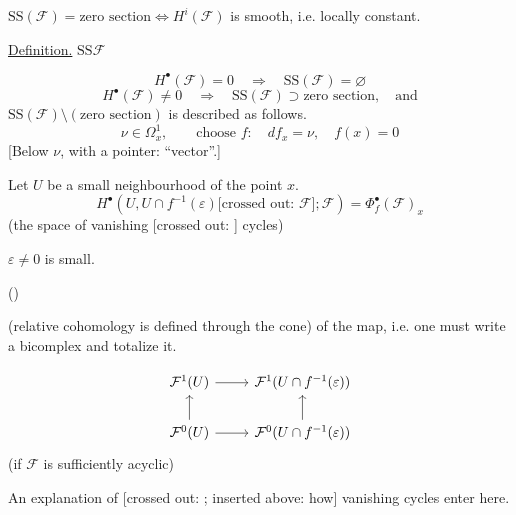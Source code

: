 $\mathrm{SS}(\mathcal{F})=\text{zero section}\Longleftrightarrow H^i(\mathcal{F})$ is smooth, i.e. locally constant.

\underline{Definition.} $\mathrm{SS}\mathcal{F}$

\begin{equation*}
H^\bullet(\mathcal{F})=0\quad\Rightarrow\quad\mathrm{SS}(\mathcal{F})=\varnothing\tag{1}
\end{equation*}
\begin{equation*}
H^\bullet(\mathcal{F})\neq0\quad\Rightarrow\quad\mathrm{SS}(\mathcal{F})\supset\text{zero section},\quad\text{and}
\end{equation*}
$\mathrm{SS}(\mathcal{F})\setminus(\text{zero section})$ is described as follows.
\begin{equation*}
\nu\in\Omega_x^1,\qquad\text{choose }f:\quad df_x=\nu,\quad f(x)=0
\end{equation*}
[Below $\nu$, with a pointer: “vector”.]

Let $U$ be a small neighbourhood of the point $x$.
\begin{equation*}
H^\bullet(U,U\cap f^{-1}(\varepsilon)\text{[crossed out: }\mathcal{F}\text{]};\mathcal{F})
=\Phi_f^\bullet(\mathcal{F})_x\tag{2}
\end{equation*}
(the space of vanishing [crossed out: ] cycles)

$\varepsilon\neq0$ is small.

()

(relative cohomology is defined through the cone)
of the map, i.e. one must write a bicomplex and
totalize it.

\begin{equation*}
\begin{tikzcd}
\mathcal{F}^1(U) \arrow[r] & \mathcal{F}^1(U\cap f^{-1}(\varepsilon)) \\
\mathcal{F}^0(U) \arrow[r] \arrow[u] & \mathcal{F}^0(U\cap f^{-1}(\varepsilon)) \arrow[u]
\end{tikzcd}
\end{equation*}
(if $\mathcal{F}$ is sufficiently
acyclic)

An explanation of [crossed out: ; inserted above: how] vanishing cycles enter here.


